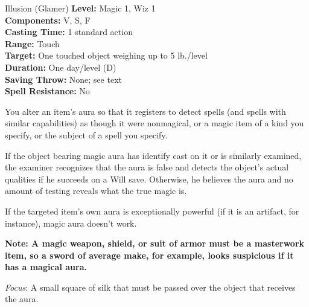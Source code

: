 {Illusion (Glamer)}
{
	\textbf{Level:}
	Magic 1, Wiz 1\\
	\textbf{Components:}
	V, S, F\\
	\textbf{Casting Time:}
	1 standard action\\
	\textbf{Range:}
	Touch\\
	\textbf{Target:}
	One touched object weighing up to 5 lb./level\\
	\textbf{Duration:}
	One day/level (D)\\
	\textbf{Saving Throw:}
	None; see text\\
	\textbf{Spell Resistance:}
	No\\
}
{
	You alter an item's aura so that it registers to detect spells (and spells with similar capabilities) as though it were nonmagical, or a magic item of a kind you specify, or the subject of a spell you specify.

	If the object bearing magic aura has identify cast on it or is similarly examined, the examiner recognizes that the aura is false and detects the object's actual qualities if he succeeds on a Will save. Otherwise, he believes the aura and no amount of testing reveals what the true magic is.

	If the targeted item's own aura is exceptionally powerful (if it is an artifact, for instance), magic aura doesn't work.

	\textbf{Note: A magic weapon, shield, or suit of armor must be a masterwork item, so a sword of average make, for example, looks suspicious if it has a magical aura.}

	\textit{Focus}:
	A small square of silk that must be passed over the object that receives the aura.

}
